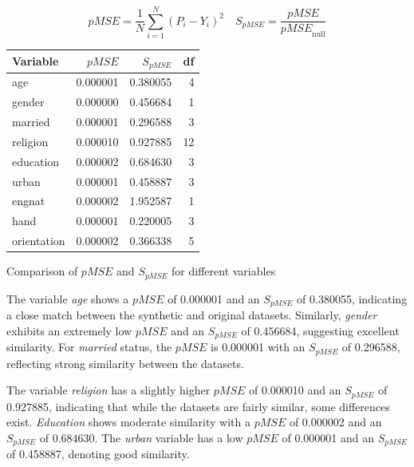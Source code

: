\documentclass[a0,portrait]{a0poster}
\begin{document}
\begin{multicols}{3}
\begin{equation}
\text{$pMSE$} = \frac{1}{N} \sum_{i=1}^{N} (P_i - Y_i)^2 \quad
S_{pMSE} = \frac{\text{$pMSE$}}{\text{$pMSE$}_{\text{null}}}
\end{equation}

\vspace{1cm}

\begin{center}
\begin{tabular}{lrrr}
  \toprule
Variable & $pMSE$ & $S_{pMSE}$ & df \\ 
  \midrule
  age & 0.000001 & 0.380055 & 4 \\ 
  gender & 0.000000 & 0.456684 & 1 \\ 
  married & 0.000001 & 0.296588 & 3 \\ 
  religion & 0.000010 & 0.927885 & 12 \\ 
  education & 0.000002 & 0.684630 & 3 \\ 
  urban & 0.000001 & 0.458887 & 3 \\ 
  engnat & 0.000002 & 1.952587 & 1 \\ 
  hand & 0.000001 & 0.220005 & 3 \\ 
  orientation & 0.000002 & 0.366338 & 5 \\ 
   \bottomrule
\end{tabular}
\caption{Comparison of $pMSE$ and $S_{pMSE}$  for different variables} 
\label{tab:pmse}
\end{center}

The variable \textit{age} shows a $pMSE$ of 0.000001 and an $S_{pMSE}$ of 0.380055, indicating a close match between the synthetic and original datasets. Similarly, \textit{gender} exhibits an extremely low $pMSE$ and an $S_{pMSE}$ of 0.456684, suggesting excellent similarity. For \textit{married} status, the $pMSE$ is 0.000001 with an $S_{pMSE}$ of 0.296588, reflecting strong similarity between the datasets.

The variable \textit{religion} has a slightly higher $pMSE$ of 0.000010 and an $S_{pMSE}$ of 0.927885, indicating that while the datasets are fairly similar, some differences exist. \textit{Education} shows moderate similarity with a $pMSE$ of 0.000002 and an $S_{pMSE}$ of 0.684630. The \textit{urban} variable has a low $pMSE$ of 0.000001 and an $S_{pMSE}$ of 0.458887, denoting good similarity.


\end{multicols}
\end{document}

